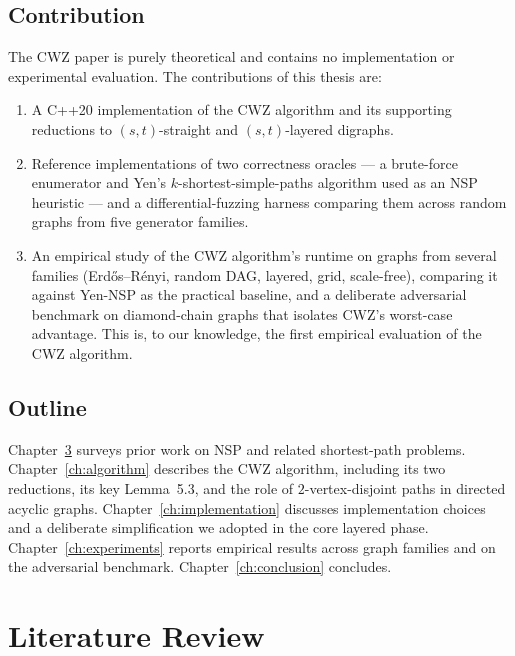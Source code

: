 \section{Contribution}

The CWZ paper is purely theoretical and contains no implementation or
experimental evaluation. The contributions of this thesis are:
\begin{enumerate}
  \item A C++20 implementation of the CWZ algorithm and its supporting
    reductions to $(s,t)$-straight and $(s,t)$-layered digraphs.
  \item Reference implementations of two correctness oracles --- a brute-force
    enumerator and Yen's $k$-shortest-simple-paths algorithm used as an NSP
    heuristic --- and a differential-fuzzing harness comparing them across
    random graphs from five generator families.
  \item An empirical study of the CWZ algorithm's runtime on graphs from
    several families (Erd\H{o}s--R\'enyi, random DAG, layered, grid,
    scale-free), comparing it against Yen-NSP as the practical baseline,
    and a deliberate adversarial benchmark on diamond-chain graphs that
    isolates CWZ's worst-case advantage. This is, to our knowledge, the
    first empirical evaluation of the CWZ algorithm.
\end{enumerate}

\section{Outline}

Chapter~\ref{ch:litreview} surveys prior work on NSP and related shortest-path
problems. Chapter~\ref{ch:algorithm} describes the CWZ algorithm, including
its two reductions, its key Lemma~5.3, and the role of $2$-vertex-disjoint
paths in directed acyclic graphs. Chapter~\ref{ch:implementation} discusses
implementation choices and a deliberate simplification we adopted in the
core layered phase. Chapter~\ref{ch:experiments} reports empirical results
across graph families and on the adversarial benchmark.
Chapter~\ref{ch:conclusion} concludes.

\chapter{Literature Review}
\label{ch:litreview}

